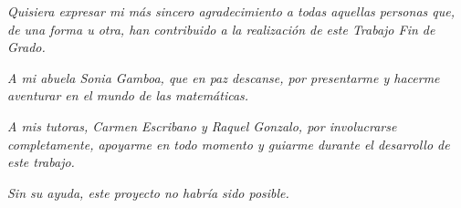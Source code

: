 \thispagestyle{empty}
\begin{flushright}
	\vspace{2cm} %

	\textit{Quisiera expresar mi más sincero agradecimiento a todas aquellas personas que, de una forma u otra, han contribuido a la realización de este Trabajo Fin de Grado.}

	\textit{A mi abuela Sonia Gamboa, que en paz descanse, por presentarme y hacerme aventurar en el mundo de las matemáticas.}

	\textit{A mis tutoras, Carmen Escribano y Raquel Gonzalo, por involucrarse completamente, apoyarme en todo momento y guiarme durante el desarrollo de este trabajo.}

	\textit{Sin su ayuda, este proyecto no habría sido posible.}
\end{flushright}
